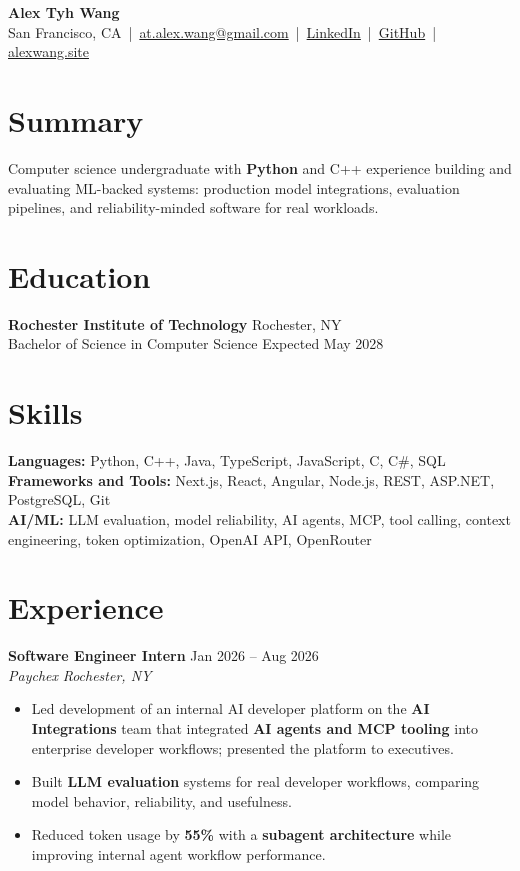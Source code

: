 \documentclass[10pt,letterpaper]{article}
\newif\ifresumeFirstRole
\newcommand{\resumeRole}[4]{%
  \ifresumeFirstRole
    \global\resumeFirstRolefalse
  \else
    \vspace{0pt plus 1fill}%
  \fi
  \textbf{#1} \hfill #2\\
  \textit{#3} \hfill \textit{#4}
}
\begin{document}
\begin{center}
{\Large \textbf{Alex Tyh Wang}}\\
San Francisco, CA \,|\, \href{mailto:at.alex.wang@gmail.com}{at.alex.wang@gmail.com} \,|\, \href{https://www.linkedin.com/in/alex-tyh-wang/}{LinkedIn} \,|\, \href{https://github.com/alextyhwang}{GitHub} \,|\, \href{https://alexwang.site}{alexwang.site}
\end{center}

\section*{Summary}
Computer science undergraduate with \textbf{Python} and C++ experience building and evaluating ML-backed systems: production model integrations, evaluation pipelines, and reliability-minded software for real workloads.

\section*{Education}
\textbf{Rochester Institute of Technology} \hfill Rochester, NY\\
Bachelor of Science in Computer Science \hfill Expected May 2028

\section*{Skills}
\textbf{Languages:} Python, C++, Java, TypeScript, JavaScript, C, C\#, SQL\\
\textbf{Frameworks and Tools:} Next.js, React, Angular, Node.js, REST, ASP.NET, PostgreSQL, Git\\
\textbf{AI/ML:} LLM evaluation, model reliability, AI agents, MCP, tool calling, context engineering, token optimization, OpenAI API, OpenRouter

\section*{Experience}
\resumeRole{Software Engineer Intern}{Jan 2026 -- Aug 2026}{Paychex}{Rochester, NY}
\begin{itemize}
  \item Led development of an internal AI developer platform on the \textbf{AI Integrations} team that integrated \textbf{AI agents and MCP tooling} into enterprise developer workflows; presented the platform to executives.
  \item Built \textbf{LLM evaluation} systems for real developer workflows, comparing model behavior, reliability, and usefulness.
  \item Reduced token usage by \textbf{55\%} with a \textbf{subagent architecture} while improving internal agent workflow performance.
\end{itemize}
\end{document}

